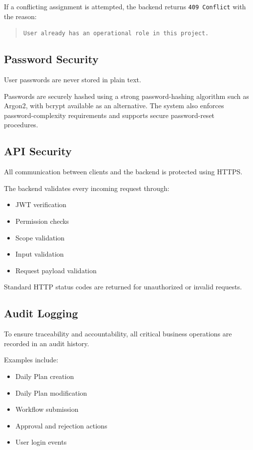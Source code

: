 \documentclass[11pt]{article}
\begin{document}
If a conflicting assignment is attempted, the backend returns
\texttt{409 Conflict} with the reason:

\begin{quote}
\texttt{User already has an operational role in this project.}
\end{quote}

\subsection{Password Security}

User passwords are never stored in plain text.

Passwords are securely hashed using a strong password-hashing algorithm such
as Argon2, with bcrypt available as an alternative. The system also enforces
password-complexity requirements and supports secure password-reset
procedures.

\subsection{API Security}

All communication between clients and the backend is protected using HTTPS.

The backend validates every incoming request through:

\begin{itemize}
    \item JWT verification
    \item Permission checks
    \item Scope validation
    \item Input validation
    \item Request payload validation
\end{itemize}

Standard HTTP status codes are returned for unauthorized or invalid requests.

\subsection{Audit Logging}

To ensure traceability and accountability, all critical business operations are
recorded in an audit history.

Examples include:

\begin{itemize}
    \item Daily Plan creation
    \item Daily Plan modification
    \item Workflow submission
    \item Approval and rejection actions
    \item User login events
\end{itemize}
\end{document}
